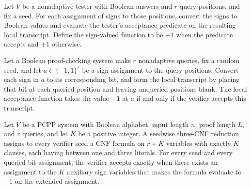 \begin{definition}
\label{FABL.localAcceptancePredicate}
\leanok
{}
Let $V$ be a nonadaptive tester with Boolean answers and $r$ query positions, and fix a
seed. For each assignment of signs to those positions, convert the signs to Boolean
values and evaluate the tester's acceptance predicate on the resulting local transcript.
Define the sign-valued function to be $-1$ when the predicate accepts and $+1$
otherwise.
\end{definition}

\begin{theorem}
\label{FABL.localAcceptancePredicate_eq_neg_one_iff}
\leanok
{}
Let a Boolean proof-checking system make $r$ nonadaptive queries, fix a random seed, and
let $a\in\{-1,1\}^r$ be a sign assignment to the query positions. Convert each sign in
$a$ to its corresponding bit, and form the local transcript by placing that bit at each
queried position and leaving unqueried positions blank. The local acceptance function
takes the value $-1$ at $a$ if and only if the verifier accepts this transcript.
\end{theorem}

\begin{definition}
\label{FABL.SeedwiseThreeCNFReduction}
\leanok
{}
Let $V$ be a PCPP system with Boolean alphabet, input length $n$, proof length $L$, and
$r$ queries, and let $K$ be a positive integer. A seedwise three-CNF reduction assigns
to every verifier seed a CNF formula on $r+K$ variables with exactly $K$ clauses, each
having between one and three literals. For every seed and every queried-bit assignment,
the verifier accepts exactly when there exists an assignment to the $K$ auxiliary sign
variables that makes the formula evaluate to $-1$ on the extended assignment.
\end{definition}

